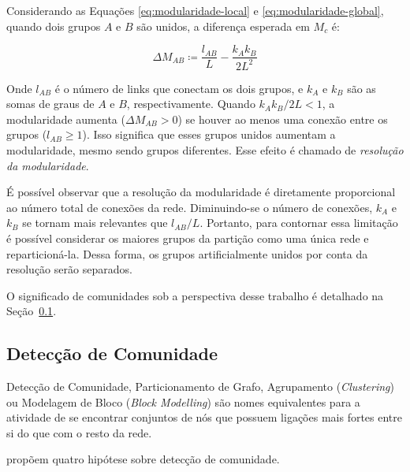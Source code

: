 \documentclass[12pt,a4paper]{article}
\theoremstyle{hypo}
\newcommand{\defn}{\coloneqq} %
\begin{document}
Considerando as Equações \ref{eq:modularidade-local} e \ref{eq:modularidade-global}, quando dois grupos $A$ e $B$ são unidos, a diferença esperada em $M_c$ é:

\begin{equation}
\Delta M_{AB} \defn \frac{l_{AB}}{L} - \frac{k_A k_B}{2L^2}
\end{equation}

Onde $l_{AB}$ é o número de links que conectam os dois grupos, e $k_A$ e $k_B$ são as somas de graus de $A$ e $B$, respectivamente. Quando $k_A k_B / 2L < 1$, a modularidade aumenta ($\Delta M_{AB} > 0$) se houver ao menos uma conexão entre os grupos ($l_{AB} \geq 1$). Isso significa que esses grupos unidos aumentam a modularidade, mesmo sendo grupos diferentes. Esse efeito é chamado de \textit{resolução da modularidade}.

É possível observar que a resolução da modularidade é diretamente proporcional ao número total de conexões da rede. Diminuindo-se o número de conexões, $k_A$ e $k_B$ se tornam mais relevantes que $l_{AB} / L$. Portanto, para contornar essa limitação é possível considerar os maiores grupos da partição como uma única rede e reparticioná-la. Dessa forma, os grupos artificialmente unidos por conta da resolução serão separados.


O significado de comunidades sob a perspectiva desse trabalho é detalhado na Seção~\ref{sec:deteccao-comunidade}.

\subsection{Detecção de Comunidade} \label{sec:deteccao-comunidade}

Detecção de Comunidade, Particionamento de Grafo, Agrupamento (\textit{Clustering}) ou Modelagem de Bloco (\textit{Block Modelling}) são nomes equivalentes para a atividade de se encontrar conjuntos de nós que possuem ligações mais fortes entre si do que com o resto da rede.

 propõem quatro hipótese sobre detecção de comunidade.
\end{document}

